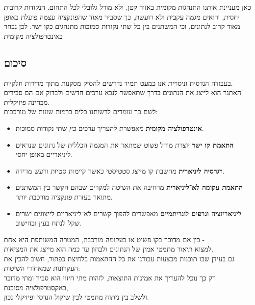 \documentclass[
  hebrew,
  letterpaper,
  DIV=11,
  numbers=noendperiod]{scrreprt}
\providecommand{\tightlist}{%
  \setlength{\itemsep}{0pt}\setlength{\parskip}{0pt}}
\begin{document}
\begin{tcolorbox}[enhanced jigsaw, colback=white, arc=.35mm, coltitle=black, breakable, toptitle=1mm, leftrule=.75mm, colbacktitle=quarto-callout-note-color!10!white, opacitybacktitle=0.6, bottomtitle=1mm, titlerule=0mm, opacityback=0, colframe=quarto-callout-note-color-frame, title=\textcolor{quarto-callout-note-color}{\faInfo}\hspace{0.5em}{פתרון}, rightrule=.15mm, bottomrule=.15mm, toprule=.15mm, left=2mm]

כאן מעניינת אותנו התנהגות מקומית באזור קטן, ולא מודל גלובלי לכל התחום.
הנקודות קרובות יחסית, ורואים מגמה עקבית ולא רועשת, כך שסביר מאוד
שהפונקציה עצמה פועלת באופן מאוד קרוב לנתונים, וכי המשתנים בין כל שתי
נקודות סמוכות מתנהגים כקו ישר. לכן נבחר באינטרפולציה מקומית

\end{tcolorbox}

\subsection{\texorpdfstring{{סיכום}}{סיכום}}\label{ux5e1ux5d9ux5dbux5d5ux5dd-2}

בעבודה הנדסית וניסויית אנו כמעט תמיד נדרשים להסיק מסקנות מתוך מדידות
חלקיות.\\
האתגר הוא לייצג את הנתונים בדרך שתאפשר לנבא ערכים חדשים ולבדוק אם הם
סבירים מבחינה פיזיקלית.\\
לשם כך עומדים לרשותנו כלים ברמות שונות של מורכבות:

\begin{itemize}
\tightlist
\item
  \textbf{אינטרפולציה מקומית} מאפשרת להעריך ערכים \emph{בין} שתי נקודות
  סמוכות.\\
\item
  \textbf{התאמת קו ישר} יוצרת מודל פשוט שמתאר את המגמה הכללית של נתונים
  שנראים ליניאריים באופן יחסי.\\
\item
  \textbf{רגרסיה ליניארית} מחשבת קו מייצג סטטיסטי כאשר קיימות סטיות ורעש
  מדידה.\\
\item
  \textbf{התאמת עקומה לא־ליניארית} מרחיבה את השיטה למקרים שבהם הקשר בין
  המשתנים מתואר בעזרת פונקציה מורכבת יותר.
\item
  \textbf{ליניאריזציה וגרפים לוגריתמיים} מאפשרים להפוך קשרים
  לא־ליניאריים לייצוגים ישרים שקל לנתח בעין ובחישוב.
\end{itemize}

בין אם מדובר בקו פשוט או בעקומה מורכבת, המטרה המשותפת היא אחת -\\
למצוא תיאור מתמטי אמין של הנתונים ולבחון עד כמה הוא מייצג את המציאות.\\
גם בעידן שבו תוכנות מבצעות עבורנו את כל ההתאמות בלחיצת כפתור, חשוב להבין
את העקרונות שמאחורי השיטות:\\
רק כך נוכל להעריך את אמינות התוצאות, לזהות מתי חיזוי הוא סביר ומתי מדובר
באקסטרפולציה מסוכנת,\\
ולשלב בין ניתוח מתמטי לבין שיקול הנדסי ופיזיקלי נכון.
\end{document}
